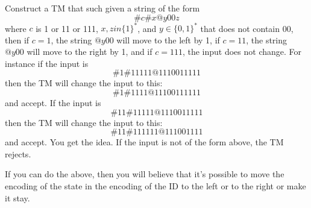   Construct a TM that such given a string of the form
  \[
  \# c \# x @y00 z 
  \]
  where $c$ is 1 or 11 or 111, $x,z in \{1\}^*$, and $y \in \{0, 1\}^*$
  that does not contain 00,
  then if $c = 1$, the string $@y00$ will move to the left by 1,
  if $c = 11$, the string $@y00$ will move to the right by 1,
  and if $c = 111$, the input does not change.
  For instance if the input is
  \[
  \# 1 \# 11111 @11100 11111 
  \]
  then the TM will change the input to this:
  \[
  \# 1 \# 1111 @11100 111111 
  \]
  and accept.
  If the input is
  \[
  \# 11 \# 11111 @11100 11111 
  \]
  then the TM will change the input to this:
  \[
  \# 11 \# 111111 @11100 1111 
  \]
  and accept.
  You get the idea.
  If the input is not of the form above, the TM rejects.
  
  If you can do the above, then you will believe that it's possible
  to move the encoding of the state in the encoding of the ID
  to the left or to the right or make it stay.
